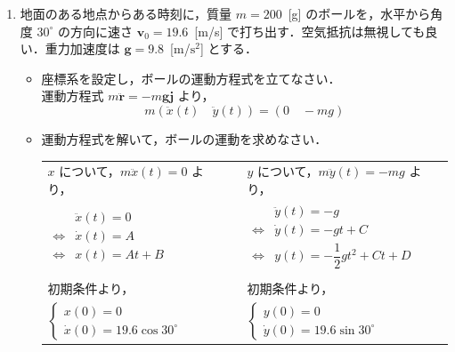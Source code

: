 \documentclass[a4paper,11pt]{ltjsarticle}
\begin{document}
\begin{enumerate}
\begin{center}
  力 $\bm{F}$ の大きさ $F$ を求めればよいので，$F = 29.4$ [kg \cdot m/$\mathrm{s}^2$]となる．
\end{center}

\clearpage

  \item 地面のある地点からある時刻に，質量 $m=200$\ [g] のボールを，水平から角度 $30^{\circ}$ の方向に速さ $\bm{v}_{0} = 19.6$\ [m/s] で打ち出す．空気抵抗は無視しても良い．重力加速度は $\bm{g} = 9.8$\ [m/$\mathrm{s}^{2}$] とする．

  \begin{itemize}
    \item 座標系を設定し，ボールの運動方程式を立てなさい．\\

    運動方程式 $m \ddot{\bm{r}} = -m\bm{g} \bm{j}$ より，
    \begin{equation}
      m(\ddot{x}(t) \quad \ddot{y}(t))=(0 \quad -mg)
    \end{equation}
    \item 運動方程式を解いて，ボールの運動を求めなさい．

    \begin{table}[hb]
      \centering
      \begin{tabular}{lcl}
        $x$ について，$m \ddot{x}(t) = 0$ より， & & $y$ について，$m \ddot{y}(t) = -mg$ より， \\
        $
        \renewcommand{\arraystretch}{2}
        \begin{array}{rl}
          &\ddot{x}(t)=0
          \\
          \Leftrightarrow
          & \dot{x}(t) = A
          \\
          \Leftrightarrow
          & x(t) = At+B
        \end{array}
        $
        & &
        $
        \renewcommand{\arraystretch}{2}
        \begin{array}{rl}
          &\ddot{y}(t)=-g
          \\
          \Leftrightarrow
          & \dot{y}(t) = -gt+C
          \\
          \Leftrightarrow
          & y(t) = - \dfrac{1}{2}gt^{2}+Ct+D
        \end{array}
        $ \\ \\
        初期条件より， & & 初期条件より，\\[11pt]
        $
        \begin{cases}
          x(0)=0 \\
          \dot{x}(0)=19.6 \cos 30^{\circ}
        \end{cases}
        $
        & &
        $
        \begin{cases}
          y(0)=0 \\
          \dot{y}(0)=19.6 \sin 30^{\circ}
        \end{cases}
        $
      \end{tabular}
    \end{table}


\end{itemize}
\end{enumerate}
\end{document}
